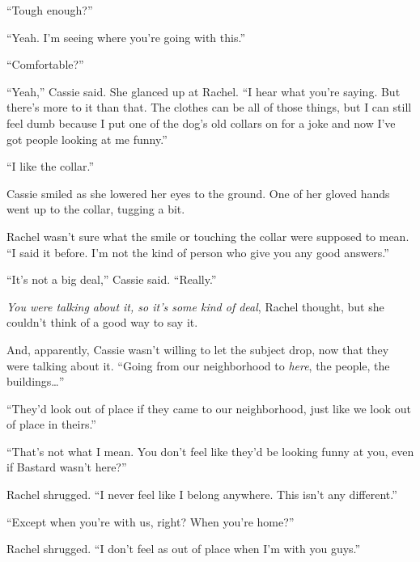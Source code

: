 ``Tough enough?''



``Yeah.  I'm seeing where you're going with this.''



``Comfortable?''



``Yeah,'' Cassie said.  She glanced up at Rachel.  ``I hear what you're saying.  But there's more to it than that.  The clothes can be all of those things, but I can still feel dumb because I put one of the dog's old collars on for a joke and now I've got people looking at me funny.''



``I like the collar.''



Cassie smiled as she lowered her eyes to the ground.  One of her gloved hands went up to the collar, tugging a bit.



Rachel wasn't sure what the smile or touching the collar were supposed to mean.  ``I said it before.  I'm not the kind of person who give you any good answers.''



``It's not a big deal,'' Cassie said.  ``Really.''



\emph{You were talking about it, so it's some kind of deal}, Rachel thought, but she couldn't think of a good way to say it.



And, apparently, Cassie wasn't willing to let the subject drop, now that they were talking about it.  ``Going from our neighborhood to \emph{here}, the people, the buildings\ldots''



``They'd look out of place if they came to our neighborhood, just like we look out of place in theirs.''



``That's not what I mean.  You don't feel like they'd be looking funny at you, even if Bastard wasn't here?''



Rachel shrugged.  ``I never feel like I belong anywhere.  This isn't any different.''



``Except when you're with us, right?  When you're home?''



Rachel shrugged.  ``I don't feel as out of place when I'm with you guys.''



